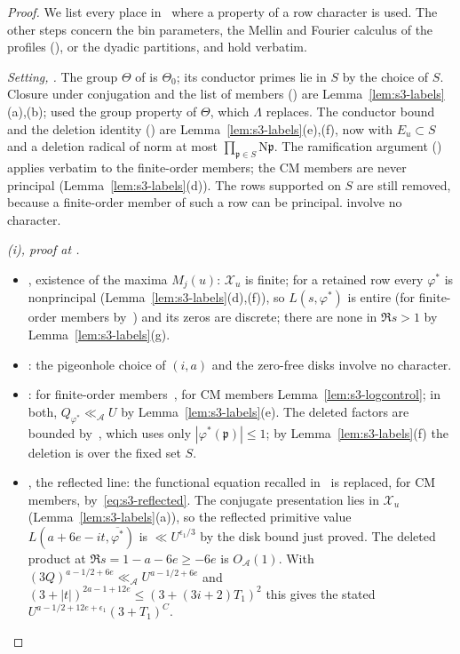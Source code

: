 \documentclass[11pt]{article}
\numberwithin{equation}{section}
\newcommand{\N}{\mathrm N}
\begin{document}
\begin{proof}
We list every place in~\cite[Section~8]{OAI78} where a property of a row character is used.
The other steps concern the bin parameters, the Mellin and Fourier calculus of the profiles
(\cite[Lemma~4.5, eqs.~(4.11) and~(4.10)]{OAI78}),
or the dyadic partitions, and hold verbatim.

\emph{Setting, \cite[Section~8.1]{OAI78}.} The group $\Theta$ of \cite[Section~8.1]{OAI78} is $\Theta_0$; its conductor primes lie in
$S$ by the choice of $S$. Closure under conjugation and the list of members (\cite[Section~8.1]{OAI78}) are
Lemma~\ref{lem:s3-labels}(a),(b); \cite{OAI78} used the group property of $\Theta$, which $\Lambda$ replaces.
The conductor bound and the deletion identity (\cite[Section~8.1]{OAI78}) are Lemma~\ref{lem:s3-labels}(e),(f), now with
$E_u\subset S$ and a deletion radical of norm at most $\prod_{\mathfrak p\in S}\N\mathfrak p$. The
ramification argument (\cite[Section~8.1]{OAI78}) applies verbatim to the finite-order members; the CM members are
never principal (Lemma~\ref{lem:s3-labels}(d)). The rows supported on $S$ are still removed, because a
finite-order member of such a row can be principal. \cite[Section~8.1]{OAI78} involve no character.

\emph{(i), proof at \cite[proof of Lemma~8.1]{OAI78}.}
\begin{itemize}
\item \cite[proof of Lemma~8.1]{OAI78}, existence of the maxima $M_j(u)$: $\mathcal X_u$ is finite; for a retained row every
 $\varphi^*$ is nonprincipal (Lemma~\ref{lem:s3-labels}(d),(f)), so $L(s,\varphi^*)$ is entire (for finite-order
 members by~\cite[proof of Lemma~4.8]{OAI78}) and its zeros are discrete; there are none in $\Re s>1$ by
 Lemma~\ref{lem:s3-labels}(g).
\item \cite[proof of Lemma~8.1]{OAI78}: the pigeonhole choice of $(i,a)$ and the zero-free disks involve no character.
\item \cite[proof of Lemma~8.1]{OAI78}: for finite-order members~\cite[Lemma~4.9]{OAI78}, for CM members
 Lemma~\ref{lem:s3-logcontrol}; in both, $Q_{\varphi^*}\ll_{\mathcal A}U$ by Lemma~\ref{lem:s3-labels}(e).
 The deleted factors are bounded by~\cite[Lemma~4.10]{OAI78}, which uses only
 $|\varphi^*(\mathfrak p)|\le1$; by Lemma~\ref{lem:s3-labels}(f) the deletion is over the fixed set $S$.
\item \cite[proof of Lemma~8.1]{OAI78}, the reflected line: the functional equation recalled in~\cite[proof of Lemma~4.8]{OAI78} is
 replaced, for CM members, by~\eqref{eq:s3-reflected}. The conjugate presentation lies in $\mathcal X_u$
 (Lemma~\ref{lem:s3-labels}(a)), so the reflected primitive value $L(a+6e-it,\overline{\varphi^*})$ is
 $\ll U^{\epsilon_1/3}$ by the disk bound just proved. The deleted product at $\Re s=1-a-6e\ge-6e$ is
 $O_{\mathcal A}(1)$. With $(3Q)^{a-1/2+6e}\ll_{\mathcal A}U^{a-1/2+6e}$ and
 $(3+|t|)^{2a-1+12e}\le(3+(3i+2)T_1)^2$ this gives the stated
 $U^{a-1/2+12e+\epsilon_1}(3+T_1)^C$.
\end{itemize}


\end{proof}
\end{document}

